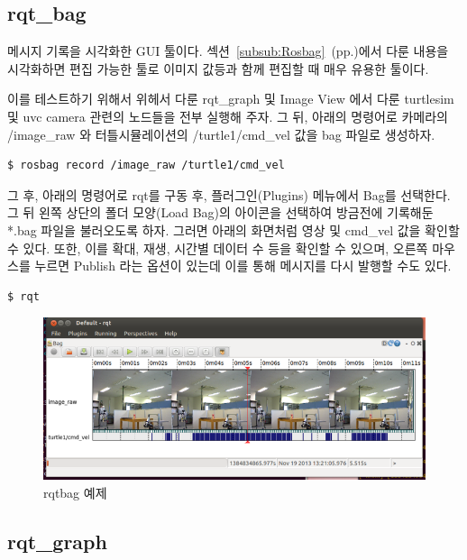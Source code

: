 \subsection{rqt\_bag}

메시지 기록을 시각화한 GUI 툴이다. 섹션~\ref{subsub:Rosbag}~(pp.\pageref{subsub:Rosbag})에서 다룬 내용을 시각화하면 편집 가능한 툴로 이미지 값등과 함께 편집할 때 매우 유용한 툴이다.

이를 테스트하기 위해서 위헤서 다룬 rqt\_graph 및 Image View 에서 다룬 turtlesim 및 uvc camera 관련의 노드들을 전부 실행해 주자. 그 뒤, 아래의 명령어로 카메라의 /image\_raw 와 터틀시뮬레이션의 /turtle1/cmd\_vel 값을 bag 파일로 생성하자.

\begin{lstlisting}[language=ROS]
$ rosbag record /image_raw /turtle1/cmd_vel
\end{lstlisting}

그 후, 아래의 명령어로 rqt를 구동 후, 플러그인(Plugins) 메뉴에서 Bag를 선택한다. 그 뒤 왼쪽 상단의 폴더 모양(Load Bag)의 아이콘을 선택하여 방금전에 기록해둔 *.bag 파일을 불러오도록 하자. 그러면 아래의 화면처럼 영상 및 cmd\_vel 값을 확인할 수 있다. 또한, 이를 확대, 재생, 시간별 데이터 수 등을 확인할 수 있으며, 오른쪽 마우스를 누르면 Publish 라는 옵션이 있는데 이를 통해 메시지를 다시 발행할 수도 있다.

\begin{lstlisting}[language=ROS]
$ rqt
\end{lstlisting}

\begin{figure}[h]
\centering\includegraphics[width=0.9\columnwidth]{pictures/chapter6/rqt_bag.png}
\caption{rqtbag 예제}
\end{figure}

\subsection{rqt\_graph}

